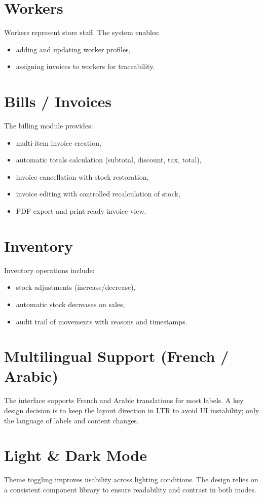 \documentclass[12pt,a4paper]{report}
\begin{document}
\section{Workers}
Workers represent store staff. The system enables:
\begin{itemize}
  \item adding and updating worker profiles,
  \item assigning invoices to workers for traceability.
\end{itemize}

\section{Bills / Invoices}
The billing module provides:
\begin{itemize}
  \item multi-item invoice creation,
  \item automatic totals calculation (subtotal, discount, tax, total),
  \item invoice cancellation with stock restoration,
  \item invoice editing with controlled recalculation of stock,
  \item PDF export and print-ready invoice view.
\end{itemize}

\section{Inventory}
Inventory operations include:
\begin{itemize}
  \item stock adjustments (increase/decrease),
  \item automatic stock decreases on sales,
  \item audit trail of movements with reasons and timestamps.
\end{itemize}

\section{Multilingual Support (French / Arabic)}
The interface supports French and Arabic translations for most labels. A key design decision is to keep the layout direction in LTR to avoid UI instability; only the language of labels and content changes.

\section{Light \& Dark Mode}
Theme toggling improves usability across lighting conditions. The design relies on a consistent component library to ensure readability and contrast in both modes.
\end{document}
